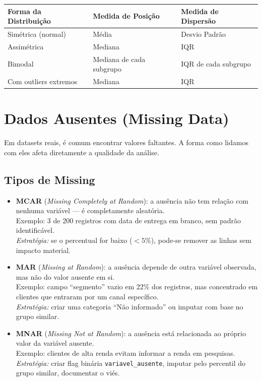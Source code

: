 \begin{center}
\begin{tabular}{|l|l|l|}
\hline
\textbf{Forma da Distribuição} & \textbf{Medida de Posição} & \textbf{Medida de Dispersão} \\
\hline
Simétrica (normal) & Média & Desvio Padrão \\
Assimétrica & Mediana & IQR \\
Bimodal & Mediana de cada subgrupo & IQR de cada subgrupo \\
Com outliers extremos & Mediana & IQR \\
\hline
\end{tabular}
\end{center}

\section{Dados Ausentes (Missing Data)}

Em datasets reais, é comum encontrar valores faltantes.  A forma como lidamos com eles afeta diretamente a qualidade da análise.

\subsection*{Tipos de Missing}

\begin{itemize}[leftmargin=*]
  \item \textbf{MCAR} (\textit{Missing Completely at Random}): a ausência não tem relação com nenhuma variável --- é completamente aleatória. \\
  Exemplo: 3 de 200 registros com data de entrega em branco, sem padrão identificável. \\
  \textit{Estratégia:} se o percentual for baixo ($<5\%$), pode-se remover as linhas sem impacto material.

  \item \textbf{MAR} (\textit{Missing at Random}): a ausência depende de outra variável observada, mas não do valor ausente em si. \\
  Exemplo: campo ``segmento'' vazio em 22\% dos registros, mas concentrado em clientes que entraram por um canal específico. \\
  \textit{Estratégia:} criar uma categoria ``Não informado'' ou imputar com base no grupo similar.

  \item \textbf{MNAR} (\textit{Missing Not at Random}): a ausência está relacionada ao próprio valor da variável ausente. \\
  Exemplo: clientes de alta renda evitam informar a renda em pesquisas. \\
  \textit{Estratégia:} criar flag binária \texttt{variavel\_ausente}, imputar pelo percentil do grupo similar, documentar o viés.
\end{itemize}

